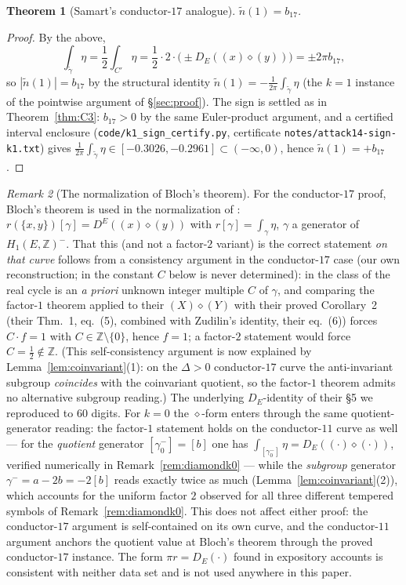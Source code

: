 \documentclass[11pt]{amsart}
\newtheorem{theorem}{Theorem}[section]
\theoremstyle{definition}
\theoremstyle{remark}
\newtheorem{remark}[theorem]{Remark}
\newcommand{\Z}{\mathbb{Z}}
\begin{document}
\begin{theorem}[Samart's conductor-$17$ analogue]\label{thm:k1}
$\tilde n(1)=b_{17}$.
\end{theorem}

\begin{proof}
By the above,
\[
  \int_{\tilde\gamma}\eta=\frac12\int_{C'}\eta
  =\frac12\cdot 2\cdot\big(\pm D_E((x)\diamond(y))\big)=\pm 2\pi b_{17},
\]
so $|\tilde n(1)|=b_{17}$ by the
structural identity $\tilde n(1)=-\frac1{2\pi}\int_{\tilde\gamma}\eta$
(the $k=1$ instance of the pointwise argument of \S\ref{sec:proof}).
The sign is settled as in Theorem~\ref{thm:C3}: $b_{17}>0$ by the same
Euler-product argument, and a certified interval enclosure
(\texttt{code/k1\_sign\_certify.py}, certificate
\texttt{notes/attack14-sign-k1.txt}) gives
$\frac1{2\pi}\int_{\tilde\gamma}\eta\in[-0.3026,-0.2961]\subset(-\infty,0)$,
hence $\tilde n(1)=+b_{17}$.
\end{proof}

\begin{remark}[The normalization of Bloch's theorem]\label{rem:normalisation}
For the conductor-$17$ proof, Bloch's theorem is used in the normalization
of \cite[Thm.~6]{LalinRam}: $r(\{x,y\})[\gamma]=D^E((x)\diamond(y))$ with
$r[\gamma]=\int_\gamma\eta$, $\gamma$ a generator of $H_1(E,\Z)^-$. That
this (and not a factor-$2$ variant) is the correct statement \emph{on that
curve} follows from a
consistency argument in the conductor-$17$ case (our own reconstruction;
in \cite{LalinRam} the constant $C$ below is never determined): in
\cite[\S7]{LalinRam} the class of the real cycle is an \emph{a priori}
unknown integer multiple $C$ of $\gamma$, and comparing the factor-$1$
theorem applied to their $(X)\diamond(Y)$ with their proved Corollary~2
(their Thm.~1, eq.~(5), combined with Zudilin's identity, their eq.~(6))
forces $C\cdot f=1$ with $C\in\Z\setminus\{0\}$, hence $f=1$; a factor-$2$
statement would force $C=\tfrac12\notin\Z$. (This self-consistency argument
is now explained by Lemma~\ref{lem:coinvariant}(1): on the $\Delta>0$
conductor-$17$ curve the anti-invariant subgroup \emph{coincides} with the
coinvariant quotient, so the factor-$1$ theorem admits no alternative
subgroup reading.) The underlying $D_E$-identity of
their \S5 we reproduced to $60$ digits. For $k=0$ the $\diamond$-form enters
through the same quotient-generator reading: the factor-$1$ statement holds
on the conductor-$11$ curve as well --- for the \emph{quotient} generator
$[\gamma^-_0]=[b]$ one has
$\int_{[\gamma^-_0]}\eta=D_E((\cdot)\diamond(\cdot))$, verified numerically
in Remark~\ref{rem:diamondk0} --- while the \emph{subgroup} generator
$\gamma^-=a-2b=-2[b]$ reads exactly twice as much
(Lemma~\ref{lem:coinvariant}(2)), which accounts for the uniform factor $2$
observed for all three different tempered symbols of
Remark~\ref{rem:diamondk0}. This does
not affect either proof: the conductor-$17$ argument is
self-contained on its own curve, and the conductor-$11$ argument anchors
the quotient value at Bloch's theorem through the proved conductor-$17$
instance. The form $\pi r=D_E(\cdot)$ found in
expository accounts is consistent with neither data set and is not
used anywhere in this paper.
\end{remark}
\end{document}
